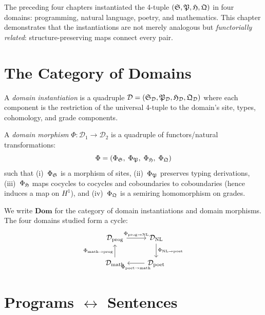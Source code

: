 The preceding four chapters instantiated the 4-tuple
$(\mathfrak{S},\mathfrak{P},\mathfrak{H},\mathfrak{Q})$ in four domains: programming,
natural language, poetry, and mathematics.  This chapter
demonstrates that the instantiations are not merely analogous
but \emph{functorially related}: structure-preserving maps
connect every pair.

\section{The Category of Domains}
\label{sec:dom-cat}

\begin{definition}
A \emph{domain instantiation} is a quadruple
$\mathcal{D}=(\mathfrak{S}_{\mathcal{D}},\mathfrak{P}_{\mathcal{D}},
 \mathfrak{H}_{\mathcal{D}},\mathfrak{Q}_{\mathcal{D}})$
where each component is the restriction of the universal
4-tuple to the domain's site, types, cohomology, and grade
components.
\end{definition}

\begin{definition}
A \emph{domain morphism} $\Phi:\mathcal{D}_1\to\mathcal{D}_2$
is a quadruple of functors/natural transformations:
\[
  \Phi = (\Phi_{\mathfrak{S}},\;\Phi_{\mathfrak{P}},\;\Phi_{\mathfrak{H}},\;\Phi_{\mathfrak{Q}})
\]
such that (i)~$\Phi_{\mathfrak{S}}$ is a morphism of sites,
(ii)~$\Phi_{\mathfrak{P}}$ preserves typing derivations,
(iii)~$\Phi_{\mathfrak{H}}$ maps cocycles to cocycles and
coboundaries to coboundaries (hence induces a map on $H^1$),
and (iv)~$\Phi_{\mathfrak{Q}}$ is a semiring homomorphism on grades.
\end{definition}

We write $\mathbf{Dom}$ for the category of domain instantiations
and domain morphisms.  The four domains studied form a cycle:
\[
\begin{tikzcd}
  \mathcal{D}_{\mathrm{prog}}
    \arrow[r,"\Phi_{\mathrm{prog}\to\mathrm{NL}}"]
  & \mathcal{D}_{\mathrm{NL}}
    \arrow[d,"\Phi_{\mathrm{NL}\to\mathrm{poet}}"]
  \\
  \mathcal{D}_{\mathrm{math}}
    \arrow[u,"\Phi_{\mathrm{math}\to\mathrm{prog}}"]
  & \mathcal{D}_{\mathrm{poet}}
    \arrow[l,"\Phi_{\mathrm{poet}\to\mathrm{math}}"]
\end{tikzcd}
\]

\section{Programs $\leftrightarrow$ Sentences}
\label{sec:prog-nl}

